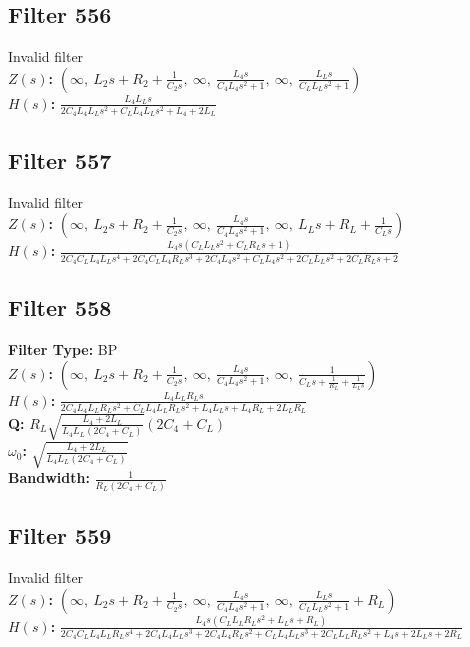 \documentclass{article}
\begin{document}
\subsection*{Filter 556}
Invalid filter \\ 
\textbf{$Z(s)$:} $\left( \infty, \  L_{2} s + R_{2} + \frac{1}{C_{2} s}, \  \infty, \  \frac{L_{4} s}{C_{4} L_{4} s^{2} + 1}, \  \infty, \  \frac{L_{L} s}{C_{L} L_{L} s^{2} + 1}\right)$ \\ 
\textbf{$H(s)$:} $\frac{L_{4} L_{L} s}{2 C_{4} L_{4} L_{L} s^{2} + C_{L} L_{4} L_{L} s^{2} + L_{4} + 2 L_{L}}$ \\ 
\subsection*{Filter 557}
Invalid filter \\ 
\textbf{$Z(s)$:} $\left( \infty, \  L_{2} s + R_{2} + \frac{1}{C_{2} s}, \  \infty, \  \frac{L_{4} s}{C_{4} L_{4} s^{2} + 1}, \  \infty, \  L_{L} s + R_{L} + \frac{1}{C_{L} s}\right)$ \\ 
\textbf{$H(s)$:} $\frac{L_{4} s \left(C_{L} L_{L} s^{2} + C_{L} R_{L} s + 1\right)}{2 C_{4} C_{L} L_{4} L_{L} s^{4} + 2 C_{4} C_{L} L_{4} R_{L} s^{3} + 2 C_{4} L_{4} s^{2} + C_{L} L_{4} s^{2} + 2 C_{L} L_{L} s^{2} + 2 C_{L} R_{L} s + 2}$ \\ 
\subsection*{Filter 558}
\textbf{Filter Type:} BP \\ 
\textbf{$Z(s)$:} $\left( \infty, \  L_{2} s + R_{2} + \frac{1}{C_{2} s}, \  \infty, \  \frac{L_{4} s}{C_{4} L_{4} s^{2} + 1}, \  \infty, \  \frac{1}{C_{L} s + \frac{1}{R_{L}} + \frac{1}{L_{L} s}}\right)$ \\ 
\textbf{$H(s)$:} $\frac{L_{4} L_{L} R_{L} s}{2 C_{4} L_{4} L_{L} R_{L} s^{2} + C_{L} L_{4} L_{L} R_{L} s^{2} + L_{4} L_{L} s + L_{4} R_{L} + 2 L_{L} R_{L}}$ \\ 
\textbf{Q:} $R_{L} \sqrt{\frac{L_{4} + 2 L_{L}}{L_{4} L_{L} \left(2 C_{4} + C_{L}\right)}} \left(2 C_{4} + C_{L}\right)$ \\ 
\textbf{$\omega_0$:} $\sqrt{\frac{L_{4} + 2 L_{L}}{L_{4} L_{L} \left(2 C_{4} + C_{L}\right)}}$ \\ 
\textbf{Bandwidth:} $\frac{1}{R_{L} \left(2 C_{4} + C_{L}\right)}$ \\ 
\subsection*{Filter 559}
Invalid filter \\ 
\textbf{$Z(s)$:} $\left( \infty, \  L_{2} s + R_{2} + \frac{1}{C_{2} s}, \  \infty, \  \frac{L_{4} s}{C_{4} L_{4} s^{2} + 1}, \  \infty, \  \frac{L_{L} s}{C_{L} L_{L} s^{2} + 1} + R_{L}\right)$ \\ 
\textbf{$H(s)$:} $\frac{L_{4} s \left(C_{L} L_{L} R_{L} s^{2} + L_{L} s + R_{L}\right)}{2 C_{4} C_{L} L_{4} L_{L} R_{L} s^{4} + 2 C_{4} L_{4} L_{L} s^{3} + 2 C_{4} L_{4} R_{L} s^{2} + C_{L} L_{4} L_{L} s^{3} + 2 C_{L} L_{L} R_{L} s^{2} + L_{4} s + 2 L_{L} s + 2 R_{L}}$ \\ 
\end{document}
